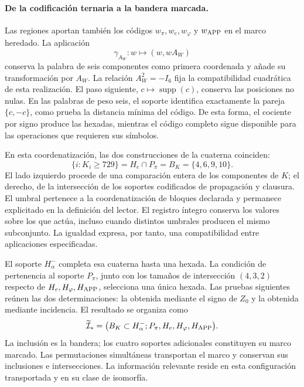 \paragraph{De la codificación ternaria a la bandera marcada.}
\label{inc-ampl-bandera}
Las regiones aportan también los códigos $w_\pi,w_e,w_\varphi$ y
$w_{\rm APP}$ en el marco heredado. La aplicación
\[
 \gamma_{A_W}:w\longmapsto(w,wA_W)
\]
conserva la palabra de seis componentes como primera coordenada y añade
su transformación por $A_W$. La relación $A_W^2=-I_6$ fija la
compatibilidad cuadrática de esta realización. El paso siguiente,
$c\mapsto\operatorname{supp}(c)$, conserva las posiciones no nulas.
En las palabras de peso seis, el soporte identifica exactamente la pareja
$\{c,-c\}$, como prueba la distancia mínima del código. De esta forma,
el cociente por signo produce las hexadas, mientras el código completo
sigue disponible para las operaciones que requieren sus símbolos.

En esta coordenatización, las dos construcciones de la cuaterna coinciden:
\begin{equation}
 \{i:K_i\geq729\}
 =H_e\cap P_\pi=B_K=\{4,6,9,10\}.
 \label{inc-ampl-cuaterna}
\end{equation}
El lado izquierdo procede de una comparación entera de los componentes
de $K$; el derecho, de la intersección de los soportes codificados de
propagación y clausura. El umbral pertenece a la coordenatización de bloques
declarada y permanece explicitado en la definición del lector. El
registro íntegro conserva los valores sobre los que actúa, incluso cuando
distintos umbrales producen el mismo subconjunto. La igualdad expresa,
por tanto, una compatibilidad entre aplicaciones especificadas.

El soporte $H^-_\alpha$ completa esa cuaterna hasta una hexada. La
condición de pertenencia al soporte $P_\pi$, junto con los tamaños de
intersección $(4,3,2)$ respecto de $H_e,H_\varphi,H_{\rm APP}$,
selecciona una única hexada. Las pruebas siguientes reúnen las dos
determinaciones: la obtenida mediante el signo de $Z_0$ y la obtenida
mediante incidencia. El resultado se organiza como
\begin{equation}
 \widetilde{\mathcal I}_*
 =\bigl(B_K\subset H^-_\alpha;
         P_\pi,H_e,H_\varphi,H_{\rm APP}\bigr).
 \label{inc-ampl-marco}
\end{equation}
La inclusión es la bandera; los cuatro soportes adicionales constituyen
su marco marcado. Las permutaciones simultáneas transportan el marco y
conservan sus inclusiones e intersecciones. La información relevante reside
en esta configuración transportada y en su clase de isomorfía.

